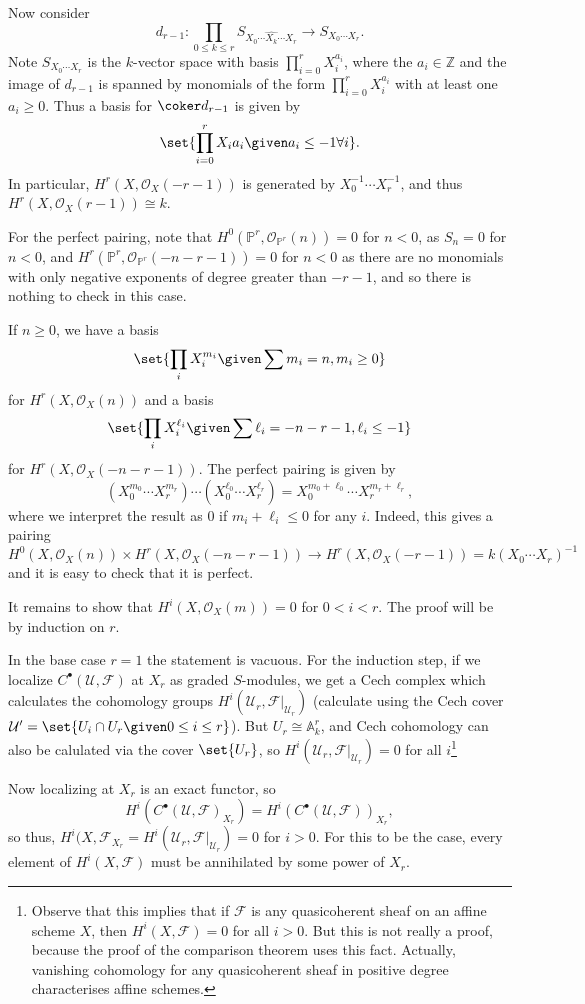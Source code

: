 Now consider
\[ d_{r-1}\colon \prod_{0\leq k\leq r} S_{X_0\cdots \widehat{X_k}\cdots X_r} \to S_{X_0\cdots X_r}. \]
Note $S_{X_0\cdots X_r}$ is the $k$-vector space with basis
$\prod_{i = 0}^r X_i^{a_i}$, where the $a_i \in \mathbb{Z}$ and the image of
$d_{r-1}$ is spanned by monomials of the form
$\prod_{i = 0}^r X_i^{a_i}$ with at least one $a_i\geq 0$. Thus a basis
for $\coker d_{r-1}$ is given by
\[ \set{\prod_{i =0}^r X_ia_i\given a_i\leq -1 \forall i}. \]
In particular, $H^r(X, \mathcal{O}_X(-r-1))$ is generated by
$X_0^{-1}\cdots X_r^{-1}$, and thus $H^r(X, \mathcal{O}_X(r-1))\cong k$.

For the perfect pairing, note that $H^0(\mathbb{P}^r, \mathcal{O}_{\mathbb{P}^r}(n)) = 0$
for $n < 0$, as $S_n = 0$ for $n < 0$, and $H^r(\mathbb{P}^r, \mathcal{O}_{\mathbb{P}^r}(-n-r-1)) = 0$
for $n < 0$ as there are no monomials with only negative exponents of degree
greater than $-r-1$, and so there is nothing to check in this case.

If $n\geq 0$, we have a basis
\[ \set{\prod_i X_i^{m_i}\given\sum m_i = n, m_i\geq 0} \]
for $H^r(X, \mathcal{O}_X(n))$ and a basis
\[ \set{\prod_i X_i^{\ell_i}\given \sum \ell_i = -n-r-1, \ell_i\leq -1} \]
for $H^r(X, \mathcal{O}_X(-n-r-1))$. The perfect pairing is given by
\[ (X_0^{m_0}\cdots X_r^{m_r})\cdots(X_0^{\ell_0}\cdots X_r^{\ell_r}) = X_0^{m_0+\ell_0}\cdots X_r^{m_r+\ell_r}, \]
where we interpret the result as $0$ if $m_i+\ell_i \leq 0$ for any $i$. Indeed,
this gives a pairing
\[ H^0(X, \mathcal{O}_X(n))\times H^r(X, \mathcal{O}_X(-n-r-1))\to H^r(X, \mathcal{O}_X(-r-1)) = k(X_0\cdots X_r)^{-1} \]
and it is easy to check that it is perfect.

It remains to show that $H^i(X, \mathcal{O}_X(m)) = 0$ for $0 < i < r$. The proof
will be by induction on $r$.

In the base case $r=1$ the statement is vacuous. For the induction step, if
we localize $C^\bullet(\mathcal{U}, \mathcal{F})$ at $X_r$ as graded $S$-modules,
we get a Cech complex which calculates the cohomology groups $H^i(\mathcal{U}_r, \mathcal{F}|_{\mathcal{U}_r})$
(calculate using the Cech cover $\mathcal{U}' = \set{U_i\cap U_r\given 0\leq i\leq r}$).
But $U_r\cong \mathbb{A}^r_k$, and Cech cohomology can also be calulated via
the cover $\set{U_r}$, so $H^i(\mathcal{U}_r, \mathcal{F}|_{\mathcal{U}_r}) = 0$ for
all $i$\footnote{Observe that this implies that if $\mathcal{F}$ is any quasicoherent
sheaf on an affine scheme $X$, then $H^i(X, \mathcal{F}) = 0$ for all $i > 0$. But this
is not really a proof, because the proof of the comparison theorem uses this fact. Actually,
vanishing cohomology for any quasicoherent sheaf in positive degree characterises affine
schemes.}

Now localizing at $X_r$ is an exact functor, so
\[ H^i(C^\bullet(\mathcal{U}, \mathcal{F})_{X_r}) = H^i(C^\bullet(\mathcal{U}, \mathcal{F}))_{X_r}, \]
so thus, $H^i(X, \mathcal{F}_{X_r} = H^i(\mathcal{U}_r, \mathcal{F}|_{\mathcal{U}_r}) = 0$ for $i > 0$.
For this to be the case, every element of $H^i(X, \mathcal{F})$ must be annihilated by some
power of $X_r$.
